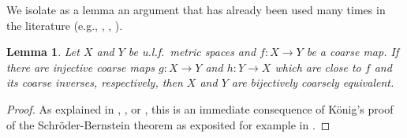 \documentclass[11pt]{amsart}
\numberwithin{equation}{section}
\newtheorem{lemma}[theorem]{Lemma}
\theoremstyle{definition}
\theoremstyle{remark}
\numberwithin{equation}{section}
\begin{document}
We isolate as a lemma an argument that has already been used many times in the literature (e.g., \cite[page 103]{Whyte1999Duke}, \cite[Corollary 6.10]{WhiteWillett2017}, \cite[IV.B-46]{Harpe2000book}).

\begin{lemma}
\label{LemmaSchroederBersteinKonig}
Let $X$ and $Y$ be u.l.f.\ metric spaces and $f\colon X\to Y$ be a coarse map. If there are injective coarse maps $g\colon X\to Y$ and $h\colon Y\to X$ which are close to $f$ and its coarse inverses, respectively, then $X$ and $Y$ are bijectively coarsely equivalent. 
\end{lemma}

\begin{proof}
As explained in \cite[Page 103]{Whyte1999Duke}, \cite[Corollary 6.10]{WhiteWillett2017}, or \cite[IV.B-46]{Harpe2000book}, this is an immediate consequence of K\"{o}nig's proof of the Schr\"oder-Bernstein theorem as exposited for example in \cite[Page 88]{HalmosBook}.
\end{proof}
\end{document}
